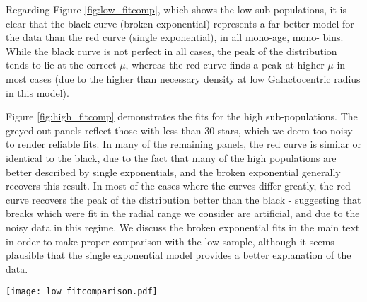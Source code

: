 Regarding Figure \ref{fig:low_fitcomp}, which shows the low \afe{} sub-populations, it is clear that the black curve (broken exponential) represents a far better model for the data than the red curve (single exponential), in all mono-age, mono-\feh{} bins. While the black curve is not perfect in all cases, the peak of the distribution tends to lie at the correct $\mu$, whereas the red curve finds a peak at higher $\mu$ in most cases (due to the higher than necessary density at low Galactocentric radius in this model).

Figure \ref{fig:high_fitcomp} demonstrates the fits for the high \afe{} sub-populations. The greyed out panels reflect those with less than 30 stars, which we deem too noisy to render reliable fits. In many of the remaining panels, the red curve is similar or identical to the black, due to the fact that many of the high \afe{} populations are better described by single exponentials, and the broken exponential generally recovers this result. In most of the cases where the curves differ greatly, the red curve recovers the peak of the distribution better than the black - suggesting that breaks which were fit in the radial range we consider are artificial, and due to the noisy data in this regime. We discuss the broken exponential fits in the main text in order to make proper comparison with the low \afe{} sample, although it seems plausible that the single exponential model provides a better explanation of the data. 

\begin{figure*}
     \texttt{[image: low\_fitcomparison.pdf]}
   \caption{ Comparison between the best fit models and the APOGEE data for mono-age, mono-\feh{} populations in the low \afe{} sub-sample. The grey histogram shows the distance modulus distribution of the APOGEE data for the mono-age, mono-\feh{} bin indicated by the (\feh{} [dex], age [Gyr]) coordinate given in each panel. The coloured curves show the distance modulus distribution found when the best fit broken exponential (black) and single exponential (red) density model is run through the effective selection function. It is clear that the broken exponential density model provides a qualitatively better fit to the data in all cases.}
    \label{fig:low_fitcomp}
\end{figure*}

